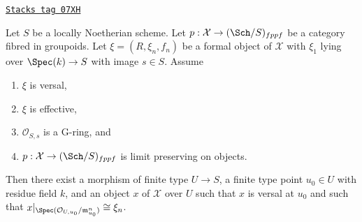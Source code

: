 \begin{lemma}
\label{artin-lemma-approximate-versal}
\href{https://stacks.math.columbia.edu/tag/07XH}{\texttt{Stacks tag 07XH}}

Let $S$ be a locally Noetherian scheme. Let
$p : \mathcal{X} \to (\Sch/S)_{fppf}$ be a category fibred in groupoids.
Let $\xi = (R, \xi_n, f_n)$ be a formal object of $\mathcal{X}$ with
$\xi_1$ lying over $\Spec(k) \to S$ with image $s \in S$. Assume
\begin{enumerate}
\item $\xi$ is versal,
\item $\xi$ is effective,
\item $\mathcal{O}_{S, s}$ is a G-ring, and
\item $p : \mathcal{X} \to (\Sch/S)_{fppf}$ is limit preserving on objects.
\end{enumerate}
Then there exist a morphism of finite type $U \to S$, a finite type
point $u_0 \in U$ with residue field $k$, and an object $x$ of $\mathcal{X}$
over $U$ such that $x$ is versal at $u_0$ and such that
$x|_{\Spec(\mathcal{O}_{U, u_0}/\mathfrak m_{u_0}^n)} \cong \xi_n$.
\end{lemma}

